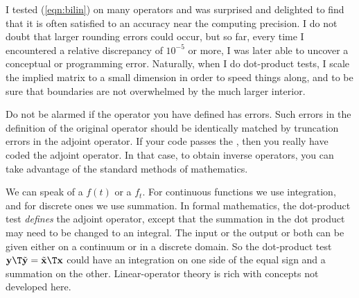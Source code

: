 
\par
I tested (\ref{eqn:bilin}) on many operators
and was surprised and delighted to find
that it is often satisfied to an accuracy near the computing precision.
I do not doubt that larger rounding errors could occur,
but so far,
every time I encountered a relative discrepancy of $10^{-5}$ or more,
I was later able to uncover a conceptual or programming error.
Naturally,
when I do dot-product tests, I scale the implied matrix to a
small dimension in order
to speed things along, and to be sure that
boundaries are not overwhelmed by the much larger interior.

\par
Do not be alarmed if the operator you have defined has  errors.
Such errors in the definition of the original operator
should be identically matched by
truncation errors in the adjoint operator.
If your code passes the ,
then you really have coded the adjoint operator.
In that case,
to obtain inverse operators,
you can take advantage of the standard methods of mathematics.

\par
We can speak of a  $f(t)$
or a  $f_t$.
For continuous functions we use integration,
and for discrete ones we use summation.
In formal mathematics, the dot-product test 
{\em  defines} the adjoint operator,
except that the summation in the dot product
may need to be changed to an integral.
The input or the output or both can be given
either on a continuum or in a discrete domain.
So the dot-product test
$\bold y\T \tilde{\bold y} = \tilde{\bold x}\T \bold x$
could have an integration on one side of the equal sign
and a summation on the other.
Linear-operator theory is rich with concepts not developed here.

